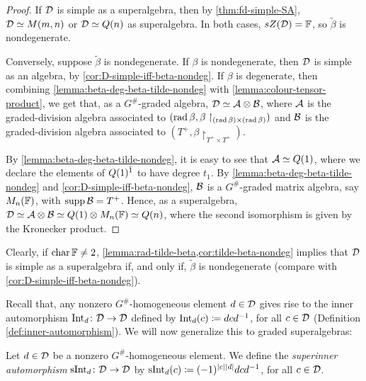 \begin{proof}
    If $\mathcal{D}$ is simple as a superalgebra, then by \cref{thm:fd-simple-SA}, $\mathcal{D} \simeq M(m,n)$ or $\mathcal{D} \simeq Q(n)$ as superalgebra. 
    In both cases, $sZ(\mathcal{D}) = \mathbb{F}$, so $\tilde\beta$ is nondegenerate.

    Conversely, suppose $\tilde\beta$ is nondegenerate. 
    If $\beta$ is nondegenerate, then $\mathcal{D}$ is simple as an algebra, by \cref{cor:D-simple-iff-beta-nondeg}.  
    If $\beta$ is degenerate, then combining  \cref{lemma:beta-deg-beta-tilde-nondeg} with \cref{lemma:colour-tensor-product}, we get that, as a $G^\#$-graded algebra, $\mathcal{D} \simeq \mathcal A \otimes \mathcal B$, where $\mathcal A$ is the graded-division algebra associated to $(\operatorname{rad} \beta, \beta\restriction_{(\operatorname{rad} \beta)\times (\operatorname{rad} \beta)})$ and $\mathcal B$ is the graded-division algebra associated to $(T^+, \beta\restriction_{T^+ \times T^+})$. 
    
    By \cref{lemma:beta-deg-beta-tilde-nondeg}, it is easy to see that $\mathcal A \simeq Q(1)$, where we declare the elements of $Q(1)^{\bar1}$ to have degree $t_1$. 
    By \cref{lemma:beta-deg-beta-tilde-nondeg} and \cref{cor:D-simple-iff-beta-nondeg}, $\mathcal B$ is a $G^\#$-graded matrix algebra, say $M_n(\mathbb{F})$, with $\operatorname{supp} \mathcal B = T^+$. 
    Hence, as a superalgebra, $\mathcal{D} \simeq \mathcal A \otimes \mathcal B \simeq Q(1) \otimes M_n(\mathbb{F}) \simeq Q(n)$, where the second isomorphism is given by the Kronecker product. 
\end{proof}

\begin{remark}\label{rmk:D-simple-iff-tilde-beta-nondeg}
    Clearly, if $\operatorname{char} \mathbb{F} \neq 2$, \cref{lemma:rad-tilde-beta,cor:tilde-beta-nondeg} implies that $\mathcal{D}$ is simple as a superalgebra if, and only if, $\tilde\beta $ is nondegenerate (compare with \cref{cor:D-simple-iff-beta-nondeg}). 
\end{remark}

Recall that, any nonzero $G^\#$-homogeneous element $d\in \mathcal{D}$ gives rise to the inner automorphism $\operatorname{Int}_d\colon \mathcal{D} \to \mathcal{D}$ defined by $\operatorname{Int}_d (c) \coloneqq dcd^{-1}$, for all $c\in \mathcal{D}$ (Definition \ref{def:inner-automorphism}). 
We will now generalize this to graded superalgebras:

\begin{defi}\label{def:superinner}
	Let $d\in \mathcal{D}$ be a nonzero $G^\#$-homogeneous element.
	We define the \emph{superinner automorphism} $\operatorname{sInt}_d\colon \mathcal{D} \to \mathcal{D}$ by $\operatorname{sInt}_d (c) \coloneqq (-1)^{|c||d|} dcd^{-1}$, for all $c\in \mathcal{D}$.
\end{defi}

